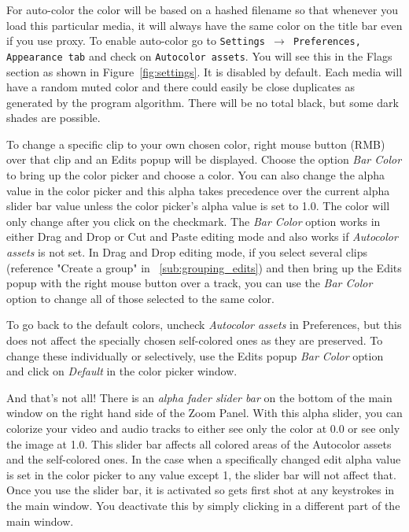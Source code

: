 For auto-color the color will be based on a hashed filename so that whenever you load this particular media, it will always have the same color on the title bar even if you use proxy.  
To enable auto-color go to \texttt{Settings $\rightarrow$ Preferences, Appearance tab} and check on \texttt{Autocolor assets}. You will see this in the Flags section
as shown in Figure~\ref{fig:settings}.  It is disabled by default.  
Each media will have a random muted color and there could easily be close duplicates as generated by the program algorithm.  There will be no total black, but some dark shades are possible.  

To change a specific clip to your own chosen color, right mouse button (RMB) over that clip and an Edits popup will be displayed.  
Choose the option \textit{Bar Color} to bring up the color picker and choose a color.   
You can also change the alpha value in the color picker and this alpha takes precedence over the current alpha slider bar value unless the color picker's alpha value is set to 1.0.   
The color will only change after you click on the checkmark.  
The \emph{Bar Color} option works in either Drag and Drop or Cut and Paste editing mode and also works if \textit{Autocolor assets} is not set.  
In Drag and Drop editing mode, if you select several clips (reference "Create a 
group" in ~\ref{sub:grouping_edits}) and then bring up the Edits popup with the right mouse button over a track, you can use the \emph{Bar Color} option to change all of those selected to the same color.

To go back to the default colors, uncheck \textit{Autocolor assets} in Preferences, but this does not affect the specially chosen self-colored ones as they are preserved.  
To change these individually or selectively, use the Edits popup \emph{Bar Color} option and click on \textit{Default} in the color picker window.  

And that’s not all!  
There is an \emph{alpha fader slider bar}  on the bottom of the main window on the right hand side of the Zoom Panel.  
With this alpha slider, you can colorize your video and audio tracks to either see only the color at 0.0 or see only the image at 1.0.  
This slider bar affects all colored areas of the Autocolor assets and the self-colored ones.  
In the case when a specifically changed edit alpha value is set in the color picker
to any value except 1, the slider bar will not affect that.  
Once you use the slider bar, it is activated so gets first shot at any keystrokes in the main window.  
You deactivate this by simply clicking in a different part of the main window.  

